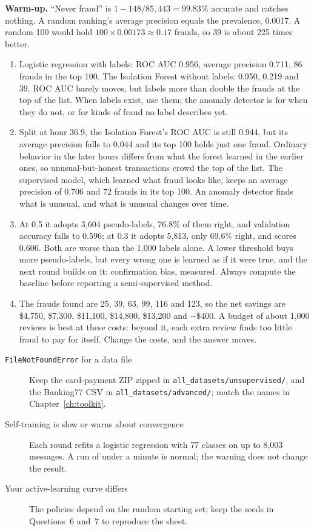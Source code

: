 \begin{expectedfindings}
\textbf{Warm-up.} ``Never fraud'' is $1-148/85{,}443=99.83\%$ accurate and catches nothing. A random ranking's average precision equals the prevalence, 0.0017. A random 100 would hold $100\times0.00173\approx0.17$ frauds, so 39 is about 225 times better.
\begin{enumerate}
  \item Logistic regression with labels: ROC AUC 0.956, average precision 0.711, 86 frauds in the top 100. The Isolation Forest without labels: 0.950, 0.219 and 39. ROC AUC barely moves, but labels more than double the frauds at the top of the list. When labels exist, use them; the anomaly detector is for when they do not, or for kinds of fraud no label describes yet.
  \item Split at hour 36.9, the Isolation Forest's ROC AUC is still 0.944, but its average precision falls to 0.044 and its top 100 holds just one fraud. Ordinary behavior in the later hours differs from what the forest learned in the earlier ones, so unusual-but-honest transactions crowd the top of the list. The supervised model, which learned what fraud looks like, keeps an average precision of 0.706 and 72 frauds in its top 100. An anomaly detector finds what is unusual, and what is unusual changes over time.
  \item At 0.5 it adopts 3,604 pseudo-labels, 76.8\% of them right, and validation accuracy falls to 0.596; at 0.3 it adopts 5,813, only 69.6\% right, and scores 0.606. Both are worse than the 1,000 labels alone. A lower threshold buys more pseudo-labels, but every wrong one is learned as if it were true, and the next round builds on it: confirmation bias, measured. Always compute the baseline before reporting a semi-supervised method.
  \item The frauds found are 25, 39, 63, 99, 116 and 123, so the net savings are \$4,750, \$7,300, \$11,100, \$14,800, \$13,200 and $-\$400$. A budget of about 1,000 reviews is best at these costs: beyond it, each extra review finds too little fraud to pay for itself. Change the costs, and the answer moves.
\end{enumerate}
\end{expectedfindings}

\begin{troubleshoot}
\begin{description}
  \item[\texttt{FileNotFoundError} for a data file] Keep the card-payment ZIP zipped in \texttt{all\_datasets/\allowbreak unsupervised/}, and the Banking77 CSV in \texttt{all\_datasets/\allowbreak advanced/}; match the names in Chapter~\ref{ch:toolkit}.
  \item[Self-training is slow or warns about convergence] Each round refits a logistic regression with 77 classes on up to 8,003 messages. A run of under a minute is normal; the warning does not change the result.
  \item[Your active-learning curve differs] The policies depend on the random starting set; keep the seeds in Questions~6 and~7 to reproduce the sheet.
\end{description}
\end{troubleshoot}

